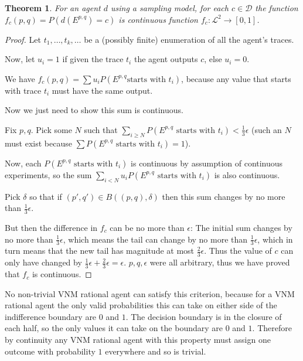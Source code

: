 \documentclass[a4paper]{book}
\newtheorem{theorem}{Theorem}
\begin{document}
\begin{theorem}
For an agent $d$
using a sampling model, for each $c \in \mathcal{D}$
the function $f_c(p, q) = P(d(E^{p, q}) = c)$
is continuous function $f_c: \mathcal{L}^2 \to [0, 1]$.
\end{theorem}

\begin{proof}
Let $t_1, \ldots, t_k, \ldots$
be a (possibly finite) enumeration of all the agent's traces.

Now, let $u_i = 1$ if given the trace $t_i$ the agent outputs $c$, else $u_i = 0$.

We have $f_c(p, q) = \sum u_iP(E^{p, q} \text{starts with $t_i$})$, because any value that starts with trace $t_i$ must have the same output.

Now we just need to show this sum is continuous.

Fix $p, q$.
Pick some $N$ such that $\sum\limits_{i \geq N} P(E^{p, q} \text{ starts with } t_i) < \frac{1}{3}\epsilon$
(such an $N$
must exist because $\sum P(E^{p, q} \text{ starts with } t_i) = 1$).

Now, each $P(E^{p, q} \text{ starts with } t_i)$
is continuous by assumption of continuous experiments, so the sum
$\sum\limits_{i < N} u_i P(E^{p, q} \text{ starts with } t_i)$
is also continuous.

Pick $\delta$
so that if $(p', q') \in B((p, q), \delta)$
then this sum changes by no more than $\frac{1}{3}\epsilon$.

But then the difference in $f_c$ can be no more than $\epsilon$:
The initial sum changes by no more than $\frac{1}{3}\epsilon$,
which means the tail can change by no more than $\frac{1}{3}\epsilon$,
which in turn means that the new tail has magnitude at most $\frac{2}{3}\epsilon$.
Thus the value of $c$ can only have changed by
$\frac{1}{3}\epsilon + \frac{2}{3}\epsilon = \epsilon$.
$p, q, \epsilon$
were all arbitrary, thus we have proved that $f_c$ is continuous.
\end{proof}

No non-trivial VNM rational agent can satisfy this criterion, because
for a VNM rational agent the only valid probabilities this can take on either
side of the indifference boundary are $0$ and $1$. The decision boundary is in the
closure of each half, so the only values it can take on the boundary are $0$
and $1$. Therefore by continuity any VNM rational agent with this property must
assign one outcome with probability $1$ everywhere and so is trivial.
\end{document}
